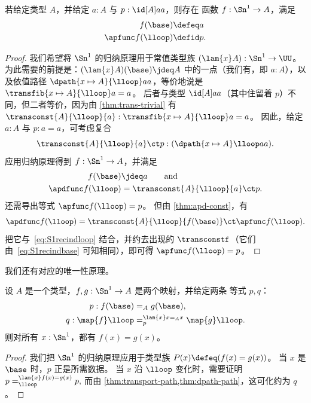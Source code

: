 \begin{lem}\label{thm:S1rec}
  若给定类型 $A$，并给定 $a:A$ 与 $p:\id[A]aa$，则存在
  函数 $f:\Sn^1\to{}A$，满足
  \begin{align*}
    f(\base)&\defeq a \\
    \apfunc f(\lloop)&\defid p.
  \end{align*}
\end{lem}
\begin{proof}
  我们希望将 $\Sn^1$ 的归纳原理用于常值类型族 $(\lam{x} A): \Sn^1\to \UU$。
  为此需要的前提是：$(\lam{x} A)(\base) \jdeq A$ 中的一点（我们有，即 $a:A$），以及依值路径 $\dpath {x \mapsto A}{\lloop} a a$，等价地说是 $\transfib{x \mapsto A}{\lloop} a = a$。
  后者与类型 $\id[A]aa$（其中住留着 $p$）不同，但二者等价，因为由 \cref{thm:trans-trivial} 有 $\transconst{A}{\lloop}{a} : \transfib{x \mapsto A}{\lloop} a= a$。
  因此，给定 $a:A$ 与 $p:a=a$，可考虑复合
  \[\transconst{A}{\lloop}{a} \ct p:(\dpath {x \mapsto A}\lloop aa).\]
  应用归纳原理得到 $f:\Sn^1\to A$，并满足
  \begin{align}
    f(\base) &\jdeq a \qquad\text{and}\label{eq:S1recindbase}\\
    \apdfunc f(\lloop) &= \transconst{A}{\lloop}{a} \ct p.\label{eq:S1recindloop}
  \end{align}
  还需导出等式 $\apfunc f(\lloop)=p$。
  但由 \cref{thm:apd-const}，有
  \[\apdfunc f(\lloop) = \transconst{A}{\lloop}{f(\base)} \ct \apfunc f(\lloop).\]
  把它与~\eqref{eq:S1recindloop} 结合，并约去出现的 $\transconstf$（它们由~\eqref{eq:S1recindbase} 可知相同），即可得 $\apfunc f(\lloop)=p$。
\end{proof}

我们还有对应的唯一性原理。

\begin{lem}\label{thm:uniqueness-for-functions-on-S1}
  设 $A$ 是一个类型，$f,g:\Sn^1\to{}A$ 是两个映射，并给定两条
  等式 $p,q$：
  \begin{align*}
    p:f(\base)&=_Ag(\base),\\
    q:\map{f}\lloop&=^{\lam{x} x=_Ax}_p\map{g}\lloop.
  \end{align*}
  则对所有 $x:\Sn^1$，都有 $f(x)=g(x)$。
\end{lem}
\begin{proof}
  我们把 $\Sn^1$ 的归纳原理应用于类型族 $P(x)\defeq(f(x)=g(x))$。
  当 $x$ 是 $\base$ 时，$p$ 正是所需数据。
  当 $x$ 沿 $\lloop$ 变化时，需要证明
  \(p=^{\lam{x} f(x)=g(x)}_{\lloop} p,\)
  而由 \cref{thm:transport-path,thm:dpath-path}，这可化约为 $q$。
\end{proof}

